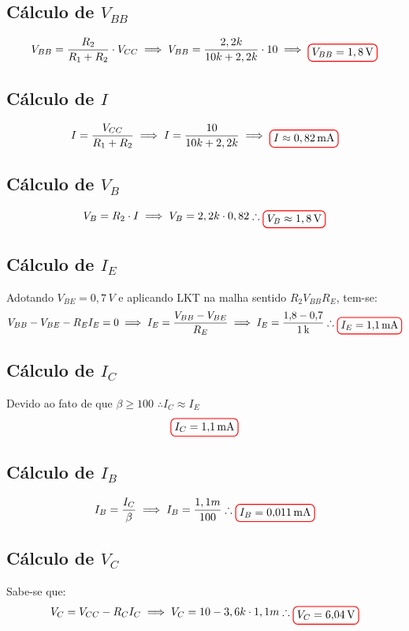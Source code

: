 \documentclass[12pt,openany,oneside,a4paper]{abntex2}
\begin{document}
\subsection{Cálculo de $V_{BB}$}
\[
V_{BB} = \frac{R_{2}}{R_{1} + R_{2}} \cdot V_{CC}
\implies
V_{BB} = \frac{2,2k}{10k + 2,2k} \cdot 10
\implies
\tikz[baseline]{\node[draw=red, thick, rounded corners] {$V_{BB} = 1,8\,\text{V}$};}
\]

\subsection{Cálculo de $I$}
\[
I = \frac{V_{CC}}{R_{1} + R_{2}} \implies
I = \frac{10}{10k + 2,2k} \implies
\tikz[baseline]{\node[draw=red, thick, rounded corners] {$I \approx 0,82\,\text{mA}$};}
\]

\subsection{Cálculo de $V_{B}$}
\[
V_{B} = R_{2} \cdot I \implies V_{B} = 2,2k \cdot 0,82 \therefore \tikz[baseline]{\node[draw=red, thick, rounded corners] {$V_{B} \approx 1,8\,\text{V}$};}
\]

\subsection{Cálculo de $I_{E}$}
Adotando $V_{BE} = 0,7\,V$ e aplicando LKT na malha sentido $R_{2}$$V_{BB}$$R_{E}$, tem-se:
\[
V_{BB} - V_{BE} - R_{E}I_{E} = 0 
\implies 
I_{E} = \frac{V_{BB} - V_{BE}}{R_{E}} 
\implies 
I_{E} = \frac{1{,}8 - 0{,}7}{1\,\text{k}} 
\therefore 
\tikz[baseline]{\node[draw=red, thick, rounded corners] {$I_{E} = 1{,}1\,\text{mA}$};}
\]

\subsection{Cálculo de $I_{C}$}
Devido ao fato de que $\beta \geq 100$ $\therefore I_C \approx I_E$
\[
\tikz[baseline]{\node[draw=red, thick, rounded corners] {$I_{C} = 1{,}1\,\text{mA}$};}
\]

\subsection{Cálculo de $I_{B}$}
\[
I_{B} = \frac {I_{C}} \beta \implies I_{B} = \frac {1,1m} {100} \therefore \tikz[baseline]{\node[draw=red, thick, rounded corners] {$I_{B} = 0{,}011\,\text{mA}$};}
\]

\subsection{Cálculo de $V_{C}$}
Sabe-se que:
\[
V_{C} = V_{CC} - R_{C} I_{C} \implies V_{C} = 10 - 3,6k \cdot 1,1m \therefore \tikz[baseline]{\node[draw=red, thick, rounded corners] {$V_{C} = 6{,}04\,\text{V}$};}
\]
\end{document}
